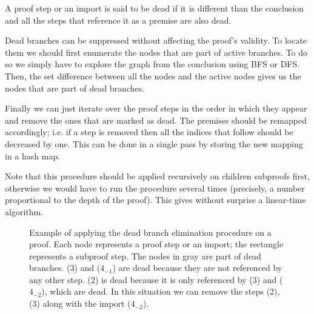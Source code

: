 \begin{definition}
A proof step or an import is said to be dead if it is different than the conclusion and all the steps that reference it as a premise are also dead.
\end{definition}

Dead branches can be suppressed without affecting the proof's validity. To locate them we should first enumerate the nodes that are part of active branches. To do so we simply have to explore the graph from the conclusion using BFS or DFS. Then, the set difference between all the nodes and the active nodes gives us the nodes that are part of dead branches.

Finally we can just iterate over the proof steps in the order in which they appear and remove the ones that are marked as dead. The premises should be remapped accordingly; i.e. if a step is removed then all the indices that follow should be decreased by one. This can be done in a single pass by storing the new mapping in a hash map.

Note that this procedure should be applied recursively on children subproofs first, otherwise we would have to run the procedure several times (precisely, a number proportional to the depth of the proof). This gives without surprise a linear-time algorithm.

\begin{figure}[H]
  \centering
  \caption[Dead branch elimination]{Example of applying the dead branch elimination procedure on a proof. Each node represents a proof step or an import; the rectangle represents a subproof step. The nodes in gray are part of dead branches. (3) and ($4_{-1}$) are dead because they are not referenced by any other step. (2) is dead because it is only referenced by (3) and ($4_{-2}$), which are dead. In this situation we can remove the steps (2), (3) along with the import ($4_{-2}$).}
  \label{fig:synthesis-dead-branches}
\end{figure}

